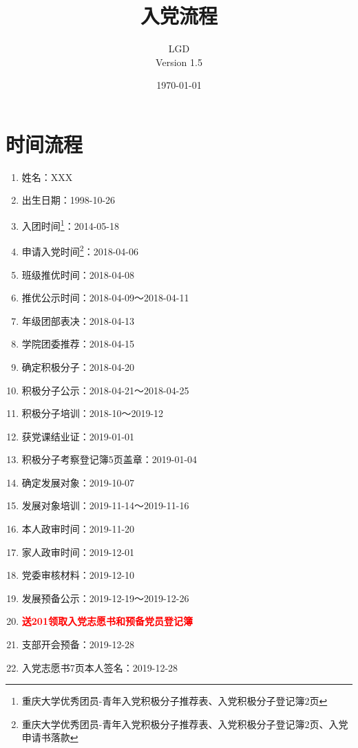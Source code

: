 \documentclass[fontset=windows]{ctexart}
\title{入党流程}
\author{LGD \\ Version 1.5}
\date{\today}
\begin{document}
\maketitle
\newpage
\section{时间流程}

\begin{tcolorbox}
    \begin{multicols}{2}
        \begin{enumerate}
            \item 姓名：XXX
            \item 出生日期：1998-10-26
            \item 入团时间\footnote{重庆大学优秀团员-青年入党积极分子推荐表、入党积极分子登记簿2页}：2014-05-18
            \item 申请入党时间\footnote{重庆大学优秀团员-青年入党积极分子推荐表、入党积极分子登记簿2页、入党申请书落款}：2018-04-06
            \item 班级推优时间：2018-04-08
            \item 推优公示时间：2018-04-09～2018-04-11
            \item 年级团部表决：2018-04-13
            \item 学院团委推荐：2018-04-15
            \item 确定积极分子：2018-04-20
            \item 积极分子公示：2018-04-21～2018-04-25
            \item 积极分子培训：2018-10～2019-12
            \item 获党课结业证：2019-01-01
            \item 积极分子考察登记簿5页盖章：2019-01-04
            \item 确定发展对象：2019-10-07
            \item 发展对象培训：2019-11-14～2019-11-16
            \item 本人政审时间：2019-11-20
            \item 家人政审时间：2019-12-01
            \item 党委审核材料：2019-12-10
            \item 发展预备公示：2019-12-19～2019-12-26
            \item \textcolor{red}{\textbf{送201领取入党志愿书和预备党员登记簿}}
            \item 支部开会预备：2019-12-28
            \item 入党志愿书7页本人签名：2019-12-28

\end{enumerate}
\end{multicols}
\end{tcolorbox}
\end{document}
